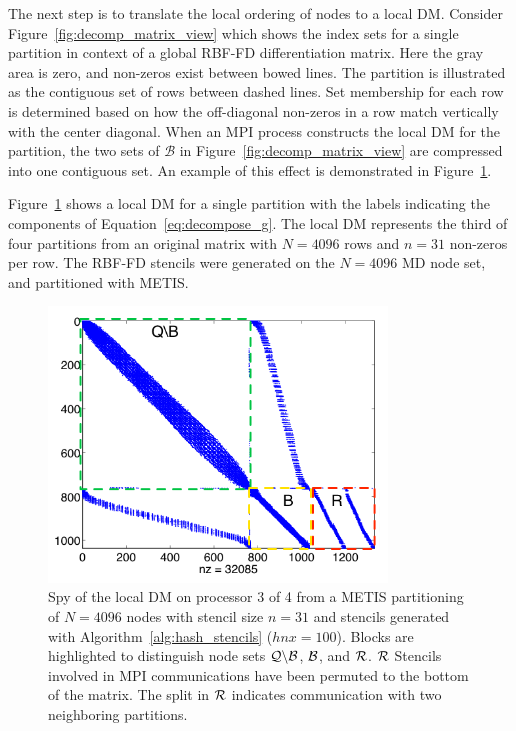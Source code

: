 \documentclass{report}
\begin{document}
The next step is to translate the local ordering of nodes to a local DM. Consider Figure~\ref{fig:decomp_matrix_view} which shows the index sets for a single partition in context of a global RBF-FD differentiation matrix. Here the gray area is zero, and non-zeros exist between bowed lines. The partition is illustrated as the contiguous set of rows between dashed lines. Set membership for each row is determined based on how the off-diagonal non-zeros in a row match vertically with the center diagonal. When an MPI process constructs the local DM for the partition, the two sets of $\mathcal{B}$ in Figure~\ref{fig:decomp_matrix_view} are compressed into one contiguous set. An example of this effect is demonstrated in Figure~\ref{fig:decomp_spy}. 

Figure~\ref{fig:decomp_spy} shows a local DM for a single partition with the labels indicating the components of Equation~\ref{eq:decompose_g}. The local DM represents the third of four partitions from an original matrix with $N=4096$ rows and $n=31$ non-zeros per row. The RBF-FD stencils were generated on the $N=4096$ MD node set, and partitioned with METIS. 
\begin{figure}
\begin{center}
\includegraphics[width=9cm]{rbffd_methods_content/decompositions/spy_metis_stencil_example_labels.png}
\caption{Spy of the local DM on processor 3 of 4 from a METIS partitioning of $N=4096$ nodes with stencil size $n=31$ and stencils generated with Algorithm~\ref{alg:hash_stencils} ($hnx=100$). Blocks are highlighted to distinguish node sets $\mathcal{Q} \backslash \mathcal{B}$, $\mathcal{B}$, and $\mathcal{R}$. $\mathcal{R}$ Stencils involved in MPI communications have been permuted to the bottom of the matrix. The split in $\mathcal{R}$ indicates communication with two neighboring partitions. }
\label{fig:decomp_spy}
\end{center}
\end{figure}
\end{document}
